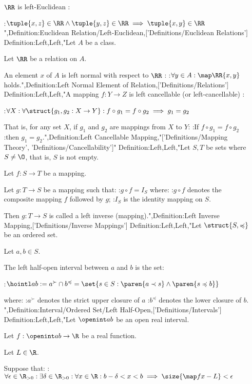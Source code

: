 $\RR$ is left-Euclidean :

:$\tuple {x, z} \in \RR \land \tuple {y, z} \in \RR \implies \tuple {x, y} \in \RR$",Definition:Euclidean Relation/Left-Euclidean,['Definitions/Euclidean Relations']
Definition:Left,Left,"Let $A$ be a class.

Let $\RR$ be a relation on $A$.


An element $x$ of $A$ is left normal with respect to $\RR$ :
:$\forall y \in A: \map \RR {x, y}$ holds.",Definition:Left Normal Element of Relation,['Definitions/Relations']
Definition:Left,Left,"A mapping $f: Y \to Z$ is left cancellable (or left-cancellable) :

:$\forall X: \forall \struct {g_1, g_2: X \to Y}: f \circ g_1 = f \circ g_2 \implies g_1 = g_2$

That is, for any set $X$, if $g_1$ and $g_2$ are mappings from $X$ to $Y$:
:If $f \circ g_1 = f \circ g_2$
:then $g_1 = g_2$.",Definition:Left Cancellable Mapping,"['Definitions/Mapping Theory', 'Definitions/Cancellability']"
Definition:Left,Left,"Let $S, T$ be sets where $S \ne \O$, that is, $S$ is not empty.

Let $f: S \to T$ be a mapping.


Let $g: T \to S$ be a mapping such that:
:$g \circ f = I_S$
where:
:$g \circ f$ denotes the composite mapping $f$ followed by $g$;
:$I_S$ is the identity mapping on $S$.


Then $g: T \to S$ is called a left inverse (mapping).",Definition:Left Inverse Mapping,['Definitions/Inverse Mappings']
Definition:Left,Left,"Let $\struct {S, \preccurlyeq}$ be an ordered set.

Let $a, b \in S$.


The left half-open interval between $a$ and $b$ is the set:

:$\hointl a b := a^\succ \cap b^\preccurlyeq = \set {s \in S: \paren {a \prec s} \land \paren {s \preccurlyeq b} }$

where:
:$a^\succ$ denotes the strict upper closure of $a$
:$b^\preccurlyeq$ denotes the lower closure of $b$.
",Definition:Interval/Ordered Set/Left Half-Open,['Definitions/Intervals']
Definition:Left,Left,"Let $\openint a b$ be an open real interval.

Let $f: \openint a b \to \R$ be a real function.

Let $L \in \R$.


Suppose that:
:$\forall \epsilon \in \R_{>0}: \exists \delta \in \R_{>0}: \forall x \in \R: b - \delta < x < b \implies \size {\map f x - L} < \epsilon$

